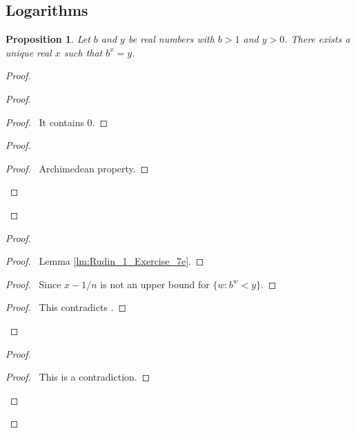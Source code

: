 \documentclass{book}
\let\qed\relax
\newtheorem{prop}{Proposition}[chapter]
\theoremstyle{definition}
\begin{document}
\subsection{Logarithms}

\begin{prop}
Let $b$ and $y$ be real numbers with $b > 1$ and $y > 0$. There exists a unique real $x$ such that $b^x = y$.
\end{prop}

\begin{proof}
\pf
{}
\begin{proof}
	\begin{proof}
		\pf\ It contains 0.
	\end{proof}
	\begin{proof}
		\begin{proof}
			\pf\ Archimedean property.
		\end{proof}
	\end{proof}
\end{proof}
\begin{proof}
	\begin{proof}
		\pf\ Lemma \ref{lm:Rudin_1_Exercise_7e}.
	\end{proof}
	\begin{proof}
		\pf\ Since $x - 1/n$ is not an upper bound for $\{ w : b^w < y \}$.
	\end{proof}
	\qedstep
	\begin{proof}
		\pf\ This contradicts .
	\end{proof}
\end{proof}
\begin{proof}
	\qedstep
	\begin{proof}
		\pf\ This is a contradiction.
	\end{proof}
\end{proof}
\qed
\end{proof}
\end{document}
